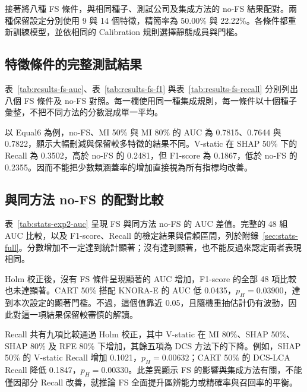 接著將八種 FS 條件，與相同種子、測試公司及集成方法的 no-FS 結果配對。兩種保留設定分別使用 9 與 14 個特徵，精簡率為 50.00\% 與 22.22\%。各條件都重新訓練模型，並依相同的 Calibration 規則選擇靜態成員與門檻。

\subsection{特徵條件的完整測試結果}

表~\ref{tab:results-fs-auc}、表~\ref{tab:results-fs-f1} 與表~\ref{tab:results-fs-recall} 分別列出八個 FS 條件及 no-FS 對照。每一欄使用同一種集成規則，每一條件以十個種子彙整，不把不同方法的分數混成單一平均。





以 Equal6 為例，no-FS、MI 50\% 與 MI 80\% 的 AUC 為 0.7815、0.7644 與 0.7822，顯示大幅刪減與保留較多特徵的結果不同。V-static 在 SHAP 50\% 下的 Recall 為 0.3502，高於 no-FS 的 0.2481，但 F1-score 為 0.1867，低於 no-FS 的 0.2355。因而不能把少數類涵蓋率的增加直接視為所有指標均改善。

\subsection{與同方法 no-FS 的配對比較}



表~\ref{tab:stats-exp2-auc} 呈現 FS 與同方法 no-FS 的 AUC 差值。完整的 48 組 AUC 比較，以及 F1-score、Recall 的檢定結果與信賴區間，列於附錄~\ref{sec:stats-full}。分數增加不一定達到統計顯著；沒有達到顯著，也不能反過來認定兩者表現相同。

Holm 校正後，沒有 FS 條件呈現顯著的 AUC 增加，F1-score 的全部 48 項比較也未達顯著。CART 50\% 搭配 KNORA-E 的 AUC 低 0.0435，\(p_H=0.03900\)，達到本次設定的顯著門檻。不過，這個值靠近 0.05，且隨機重抽估計仍有波動，因此對這一項結果保留較審慎的解讀。

Recall 共有九項比較通過 Holm 校正，其中 V-static 在 MI 80\%、SHAP 50\%、SHAP 80\% 及 RFE 80\% 下增加，其餘五項為 DCS 方法下的下降。例如，SHAP 50\% 的 V-static Recall 增加 0.1021，\(p_H=0.00632\)；CART 50\% 的 DCS-LCA Recall 降低 0.1847，\(p_H=0.00330\)。此差異顯示 FS 的影響與集成方法有關，不能僅因部分 Recall 改善，就推論 FS 全面提升區辨能力或精確率與召回率的平衡。

